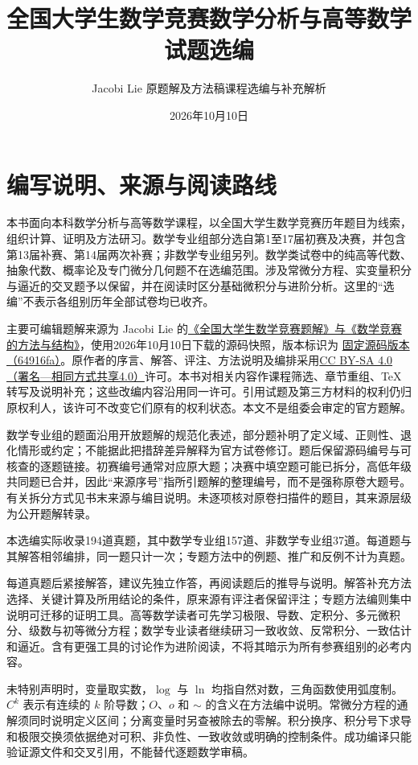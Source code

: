 \documentclass[UTF8,12pt,a4paper,fontset=fandol]{ctexart}
\title{全国大学生数学竞赛数学分析与高等数学试题选编}
\author{Jacobi Lie 原题解及方法稿\quad 课程选编与补充解析}
\date{2026年10月10日}
\begin{document}
\maketitle

\section*{编写说明、来源与阅读路线}
本书面向本科数学分析与高等数学课程，以全国大学生数学竞赛历年题目为线索，组织计算、证明及方法研习。数学专业组部分选自第1至17届初赛及决赛，并包含第13届补赛、第14届两次补赛；非数学专业组另列。数学类试卷中的纯高等代数、抽象代数、概率论及专门微分几何题不在选编范围。涉及常微分方程、实变量积分与逼近的交叉题予以保留，并在阅读时区分基础微积分与进阶分析。这里的“选编”不表示各组别历年全部试卷均已收齐。

主要可编辑题解来源为 Jacobi Lie 的\href{https://github.com/lzxcr/cmc-mathematics}{《全国大学生数学竞赛题解》与《数学竞赛的方法与结构》}，使用2026年10月10日下载的源码快照，版本标识为 \href{https://github.com/lzxcr/cmc-mathematics/tree/64916fa1fdbc3e444a652eca204d5669058ee321}{固定源码版本（64916fa）}。原作者的序言、解答、评注、方法说明及编排采用\href{https://creativecommons.org/licenses/by-sa/4.0/}{CC BY-SA 4.0（署名—相同方式共享4.0）}许可。本书对相关内容作课程筛选、章节重组、TeX 转写及说明补充；这些改编内容沿用同一许可。引用试题及第三方材料的权利仍归原权利人，该许可不改变它们原有的权利状态。本文不是组委会审定的官方题解。

数学专业组的题面沿用开放题解的规范化表述，部分题补明了定义域、正则性、退化情形或约定；不能据此把措辞差异解释为官方试卷修订。题后保留源码编号与可核查的逐题链接。初赛编号通常对应原大题；决赛中填空题可能已拆分，高低年级共同题已合并，因此“来源序号”指所引题解的整理编号，而不是强称原卷大题号。有关拆分方式见书末来源与编目说明。未逐项核对原卷扫描件的题目，其来源层级为公开题解转录。

本选编实际收录194道真题，其中数学专业组157道、非数学专业组37道。每道题与其解答相邻编排，同一题只计一次；专题方法中的例题、推广和反例不计为真题。

每道真题后紧接解答，建议先独立作答，再阅读题后的推导与说明。解答补充方法选择、关键计算及所用结论的条件，原来源有评注者保留评注；专题方法编则集中说明可迁移的证明工具。高等数学读者可先学习极限、导数、定积分、多元微积分、级数与初等微分方程；数学专业读者继续研习一致收敛、反常积分、一致估计和逼近。含有更强工具的讨论作为进阶阅读，不将其暗示为所有参赛组别的必考内容。

未特别声明时，变量取实数，$\log$ 与 $\ln$ 均指自然对数，三角函数使用弧度制。$C^k$ 表示有连续的 $k$ 阶导数；$O$、$o$ 和 $\sim$ 的含义在方法编中说明。常微分方程的通解须同时说明定义区间；分离变量时另查被除去的零解。积分换序、积分号下求导和极限交换须依据绝对可积、非负性、一致收敛或明确的控制条件。成功编译只能验证源文件和交叉引用，不能替代逐题数学审稿。
\tableofcontents
\clearpage
\end{document}
